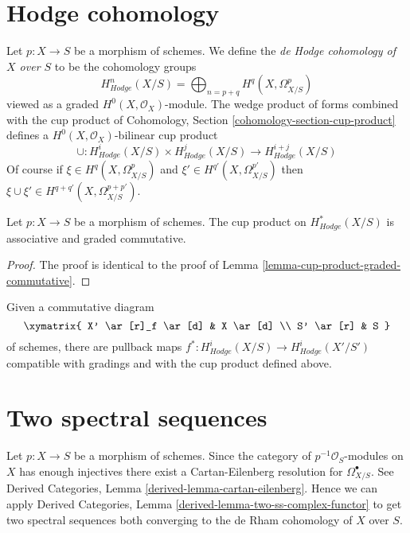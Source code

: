 \section{Hodge cohomology}
\label{section-hodge-cohomology}

\noindent
Let $p : X \to S$ be a morphism of schemes. We define the
{\it de Hodge cohomology of $X$ over $S$} to be the cohomology groups
$$
H^n_{Hodge}(X/S) = \bigoplus\nolimits_{n = p + q} H^q(X, \Omega^p_{X/S})
$$
viewed as a graded $H^0(X, \mathcal{O}_X)$-module. The wedge product
of forms combined with the cup product of
Cohomology, Section \ref{cohomology-section-cup-product}
defines a $H^0(X, \mathcal{O}_X)$-bilinear cup product
$$
\cup :
H^i_{Hodge}(X/S) \times H^j_{Hodge}(X/S)
\longrightarrow
H^{i + j}_{Hodge}(X/S)
$$
Of course if  $\xi \in H^q(X, \Omega^p_{X/S})$ and
$\xi' \in H^{q'}(X, \Omega^{p'}_{X/S})$ then $\xi \cup \xi' \in
H^{q + q'}(X, \Omega^{p + p'}_{X/S})$.

\begin{lemma}
\label{lemma-cup-product-hodge-graded-commutative}
Let $p : X \to S$ be a morphism of schemes.
The cup product on $H^*_{Hodge}(X/S)$ is associative and graded commutative.
\end{lemma}

\begin{proof}
The proof is identical to the proof of
Lemma \ref{lemma-cup-product-graded-commutative}.
\end{proof}

\noindent
Given a commutative diagram
$$
\xymatrix{
X' \ar[r]_f \ar[d] & X \ar[d] \\
S' \ar[r] & S
}
$$
of schemes, there are pullback maps
$f^* : H^i_{Hodge}(X/S) \longrightarrow H^i_{Hodge}(X'/S')$
compatible with gradings and with the cup product defined above.







\section{Two spectral sequences}
\label{section-hdoge-to-de-rham}

\noindent
Let $p : X \to S$ be a morphism of schemes. Since the category
of $p^{-1}\mathcal{O}_S$-modules on $X$ has enough injectives
there exist a Cartan-Eilenberg resolution for $\Omega^\bullet_{X/S}$.
See Derived Categories, Lemma \ref{derived-lemma-cartan-eilenberg}.
Hence we can apply Derived Categories, Lemma
\ref{derived-lemma-two-ss-complex-functor} to get two spectral sequences
both converging to the de Rham cohomology of $X$ over $S$.

